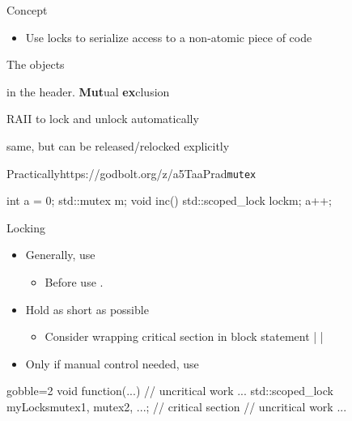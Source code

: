 \begin{frame}[fragile]
  \begin{block}{Concept}
    \begin{itemize}
    \item Use locks to serialize access to a non-atomic piece of code
    \end{itemize}
  \end{block}
  \pause
  \begin{block}{The objects}
    \begin{description}[labelwidth=1.8cm]
    \item[std::mutex] in the  header. \textbf{Mut}ual \textbf{ex}clusion
    \item[std::scoped\_lock] RAII to lock and unlock automatically
    \item[std::unique\_lock] same, but can be released/relocked explicitly
    \end{description}
  \end{block}
  \pause
  \begin{exampleblockGB}{Practically}{https://godbolt.org/z/a5TaaPrad}{\texttt{mutex}}
    \begin{cppcode*}{}
      int a = 0;
      std::mutex m;
      void inc() {
        std::scoped_lock lock{m};
        a++;
      }
    \end{cppcode*}
  \end{exampleblockGB}
\end{frame}

\begin{frame}[fragile]
  \begin{goodpractice}{Locking}
    \begin{itemize}
    \item Generally, use 
      \begin{itemize}
      \item Before  use .
      \end{itemize}
    \item Hold as short as possible
      \begin{itemize}
      \item Consider wrapping critical section in block statement \cppinline|{ }|
      \end{itemize}
    \item Only if manual control needed, use 
    \end{itemize}
  \end{goodpractice}
  \begin{exampleblock}{}
    \begin{cppcode*}{gobble=2}
      void function(...) {
        // uncritical work ...
        {
          std::scoped_lock myLocks{mutex1, mutex2, ...};
          // critical section
        }
        // uncritical work ...
      }
    \end{cppcode*}
  \end{exampleblock}
\end{frame}

